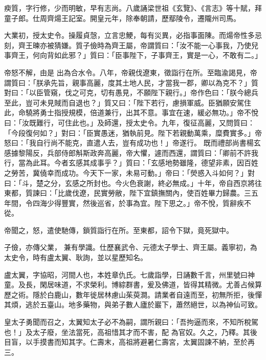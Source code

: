 \begin{pinyinscope}
 瘐質，字行修，少而明敏，早有志尚。八歲誦梁世祖《玄覽》、《言志》等十賦，拜童子郎。仕周齊煬王記室。開皇元年，除奉朝請，歷鄢陵令，遷隴州司馬。



 大業初，授太史令。操履貞愨，立言忠鯁，每有災異，必指事面陳。而煬帝性多忌刻，齊王暕亦被猜嫌。質子儉時為齊王屬，帝謂質曰：「汝不能一心事我，乃使兒事齊王，何向背如此邪？」質曰：「臣事陛下，子事齊王，實是一心，不敢有二。」



 帝怒不解，由是
 出為合水令。八年，帝親伐遼東，徵詣行在所。至臨渝謁見，帝謂質曰：「朕承先旨，親事高麗，度其土地人民，才當我一郡，卿以為克不？」質對曰：「以臣管窺，伐之可克，切有愚見，不願陛下親行。」帝作色曰：「朕今總兵至此，豈可未見賊而自退也？」質又曰：「陛下若行，慮損軍威。臣猶願安駕住此，命驍將勇士指授規模，倍道兼行，出其不意。事宜在速，緩必無功。」帝不悅曰：「汝既難行，可住此也。」及師還，授太史令。九年，復征高麗，又問質曰：「今段復何如？」對曰：「臣實愚迷，猶執前見。陛下若親動萬乘，糜費實多。」帝怒曰：「我自行尚不能克，直遣人去，豈有成功也！」帝遂行。
 既而禮部尚書楊玄感據黎陽反，兵部侍郎斛斯政奔高麗，帝大懼，遽而西還，謂質曰：「卿前不許我行，當為此耳。今者玄感其成事乎？」質曰：「玄感地勢雖隆，德望非素，因百姓之勞苦，冀僥幸而成功。今天下一家，未易可動。」帝曰：「熒惑入斗如何？」對曰：「斗，楚之分，玄感之所封也。今火色衰謝，終必無成。」十年，帝自西京將往東都，質諫曰：「比歲伐遼，民實勞敝，陛下宜鎮撫關內，使百姓畢力歸農。三五年間，令四海少得豐實，然後巡省，於事為宜。陛下思之。」帝不悅，質辭疾不從。



 帝聞之，怒，遣使馳傳，鎖質詣行在所。至東都，詔令下獄，竟死獄中。



 子儉，亦傳父業，
 兼有學識。仕歷襄武令、元德太子學士、齊王屬。義寧初，為太史令，時有盧太翼、耿詢，並以星歷知名。



 盧太翼，字協昭，河間人也，本姓章仇氏。七歲詣學，日誦數千言，州里號曰神童。及長，閑居味道，不求榮利。博綜群書，爰及佛道，皆得其精微。尤善占候算歷之術。隱於白鹿山，數年徙居林慮山茱萸澗。請業者自遠而至，初無所拒，後憚其煩，逃於五臺山。地多藥物，與弟子數人廬於巖下，蕭然絕世，以為神仙可致。



 皇太子勇聞而召之，太翼知太子必不為嗣，謂所親曰：「吾拘逼而來，不知所稅駕也！」及太子廢，坐法當死，高祖惜其才而不害，配
 為官奴。久之，乃釋。其後目盲，以手摸書而知其字。仁壽末，高祖將避暑仁壽宮，太翼固諫不納，至於再三。




\end{pinyinscope}
